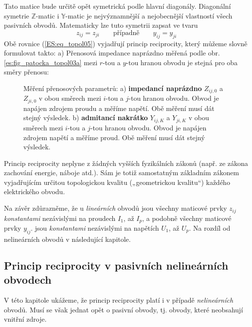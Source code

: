       Tato matice bude určitě opět symetrická podle hlavní diagonály. Diagonální symetrie 
      \(\mathbb{Z}\)-matic i \(\mathbb{Y}\)-matic je nejvýznamnější a nejobecnější vlastností všech 
      pasivních obvodů. Matematicky lze tuto symetrii zapsat ve tvaru
      \begin{equation}\label{ES:eq_topol05}
        z_{ij} = z_{ji} \qquad\text{případně}\qquad y_{ij} = y_{ji}
      \end{equation}
      Obě rovnice (\ref{ES:eq_topol05}) vyjadřují princip reciprocity, který můžeme slovně 
      formulovat takto: a) Přenosová impedance naprázdno měřená podle obr. 
      \ref{es:fig_patocka_topol03a} mezi \(r\)-tou a \(y\)-tou hranou obvodu je stejná pro oba 
      směry přenosu:
      \begin{figure}[ht!]
        \centering  
           \newline
        \caption{Měření přenosových parametrů: a) \textbf{impedancí naprázdno} \(Z_{ij,0}\) a 
                 \(Z_{ji,0}\) v obou směrech mezi \(i\)-tou a \(j\)-tou hranou obvodu. Obvod je 
                 napájen zdrojem proudu a měříme napětí. Obě měření musí dát stejný výsledek. b)  
                 \textbf{admitancí nakrátko} \(Y_{ij,K}\) a \(Y_{ji,K}\) v obou směrech mezi 
                 \(i\)-tou a \(j\)-tou hranou obvodu. Obvod je napájen zdrojem napětí a měříme 
                 proud. Obě měření musí dát stejný výsledek. \cite[s.~45]{Patocka4}} 
        \label{es:fig_patocka_topol03}
      \end{figure}
      
      Princip reciprocity neplyne z žádných vyšších fyzikálních zákonů (např. ze zákona zachování 
      energie, náboje atd.). Sám je totiž samostatným základním zákonem vyjadřujícím určitou 
      topologickou kvalitu („geometrickou kvalitu“) každého elektrického obvodu.
      
      Na závěr zdůrazněme, že u \emph{lineárních} obvodů jsou všechny maticové prvky \(z_{ij}\) 
      \emph{konstantami} nezávislými na proudech \(I_1\), až \(I_p\), a podobně všechny maticové 
      prvky \(y_{ij}\). jsou \emph{konstantami} nezávislými na napětích \(U_1\), až \(U_p\). Na 
      rozdíl od nelineárních obvodů v následující kapitole.
      
    \subsection{Princip reciprocity v pasivních nelineárních obvodech}\label{teo:IchapIIIsecIsubIII}
      V této kapitole ukážeme, že princip reciprocity platí i v případě \emph{nelineárních} obvodů. 
      Musí se však jednat opět o pasivní obvody, tj. obvody, které neobsahují vnitřní zdroje.
      

